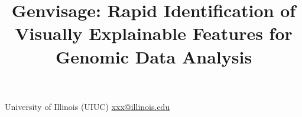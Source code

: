 \documentclass{sigplanconf}
\newcommand{\genviz}{{\sc Genvisage}\xspace}
\begin{document}
\title{\genviz: Rapid Identification of Visually Explainable Features for Genomic Data Analysis}


       {University of Illinois (UIUC)}
        {\url{xxx@illinois.edu}}


\maketitle



{\scriptsize


}
\end{document}
